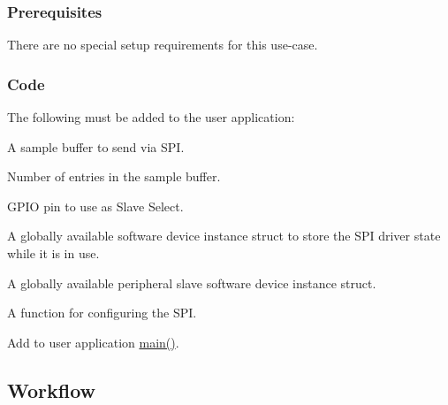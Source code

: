 \hypertarget{asfdoc_sam0_sercom_spi_master_basic_use_asfdoc_sam0_sercom_spi_master_basic_use_prereq}{}\subsubsection{Prerequisites}\label{asfdoc_sam0_sercom_spi_master_basic_use_asfdoc_sam0_sercom_spi_master_basic_use_prereq}
There are no special setup requirements for this use-\/case.\hypertarget{asfdoc_sam0_sercom_spi_master_basic_use_asfdoc_sam0_sercom_spi_master_basic_use_setup_code}{}\subsubsection{Code}\label{asfdoc_sam0_sercom_spi_master_basic_use_asfdoc_sam0_sercom_spi_master_basic_use_setup_code}
The following must be added to the user application\+:

A sample buffer to send via S\+PI. 
\begin{DoxyCodeInclude}{0}
\end{DoxyCodeInclude}
Number of entries in the sample buffer. 
\begin{DoxyCodeInclude}{0}
\end{DoxyCodeInclude}
G\+P\+IO pin to use as Slave Select. 
\begin{DoxyCodeInclude}{0}
\end{DoxyCodeInclude}
A globally available software device instance struct to store the S\+PI driver state while it is in use. 
\begin{DoxyCodeInclude}{0}
\end{DoxyCodeInclude}
A globally available peripheral slave software device instance struct. 
\begin{DoxyCodeInclude}{0}
\end{DoxyCodeInclude}
A function for configuring the S\+PI. 
\begin{DoxyCodeInclude}{0}
\end{DoxyCodeInclude}
 Add to user application {\ttfamily \mbox{\hyperlink{csc__app_8c_a840291bc02cba5474a4cb46a9b9566fe}{main()}}}. 
\begin{DoxyCodeInclude}{0}
\end{DoxyCodeInclude}
 \hypertarget{asfdoc_sam0_sercom_spi_master_basic_use_asfdoc_sam0_sercom_spi_master_basic_use_workflow}{}\subsection{Workflow}\label{asfdoc_sam0_sercom_spi_master_basic_use_asfdoc_sam0_sercom_spi_master_basic_use_workflow}

